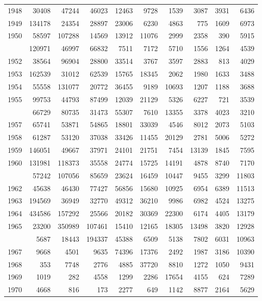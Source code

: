 \documentclass[
]{article}
\begin{document}
\begin{longtable}[t]{lrrrrrrrrr}
1948 & 30408 & 47244 & 46023 & 12463 & 9728 & 1539 & 3087 & 3931 & 6436\\
1949 & 134178 & 24354 & 28897 & 23006 & 6230 & 4863 & 775 & 1609 & 6973\\
1950 & 58597 & 107288 & 14569 & 13912 & 11076 & 2999 & 2358 & 390 & 5915\\
\addlinespace
1951 & 120971 & 46997 & 66832 & 7511 & 7172 & 5710 & 1556 & 1264 & 4539\\
1952 & 38564 & 96904 & 28800 & 33514 & 3767 & 3597 & 2883 & 813 & 4029\\
1953 & 162539 & 31012 & 62539 & 15765 & 18345 & 2062 & 1980 & 1633 & 3488\\
1954 & 55558 & 131077 & 20772 & 36455 & 9189 & 10693 & 1207 & 1188 & 3688\\
1955 & 99753 & 44793 & 87499 & 12039 & 21129 & 5326 & 6227 & 721 & 3539\\
\addlinespace
1956 & 66729 & 80735 & 31473 & 55307 & 7610 & 13355 & 3378 & 4023 & 3210\\
1957 & 65741 & 53871 & 54865 & 18801 & 33039 & 4546 & 8012 & 2073 & 5103\\
1958 & 61287 & 53120 & 37038 & 33426 & 11455 & 20129 & 2781 & 5006 & 5272\\
1959 & 146051 & 49667 & 37971 & 24101 & 21751 & 7454 & 13139 & 1845 & 7595\\
1960 & 131981 & 118373 & 35558 & 24774 & 15725 & 14191 & 4878 & 8740 & 7170\\
\addlinespace
1961 & 57242 & 107056 & 85659 & 23624 & 16459 & 10447 & 9455 & 3299 & 11803\\
1962 & 45638 & 46430 & 77427 & 56856 & 15680 & 10925 & 6954 & 6389 & 11513\\
1963 & 194569 & 36949 & 32770 & 49312 & 36210 & 9986 & 6982 & 4524 & 13275\\
1964 & 434586 & 157292 & 25566 & 20182 & 30369 & 22300 & 6174 & 4405 & 13179\\
1965 & 23200 & 350989 & 107461 & 15410 & 12165 & 18305 & 13498 & 3820 & 12928\\
\addlinespace
1966 & 5687 & 18443 & 194337 & 45388 & 6509 & 5138 & 7802 & 6031 & 10963\\
1967 & 9668 & 4501 & 9635 & 74396 & 17376 & 2492 & 1987 & 3186 & 10390\\
1968 & 353 & 7748 & 2776 & 4885 & 37720 & 8810 & 1272 & 1050 & 9431\\
1969 & 1019 & 282 & 4558 & 1299 & 2286 & 17654 & 4155 & 624 & 7289\\
1970 & 4668 & 816 & 173 & 2277 & 649 & 1142 & 8877 & 2164 & 5629\\

\end{longtable}
\end{document}
